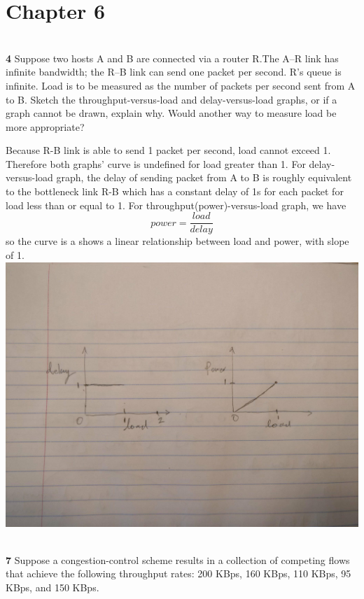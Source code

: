 \documentclass[11pt]{article}
\begin{document}
\section*{Chapter 6}

$ $\\
\textbf{4} Suppose two hosts A and B are connected via a router R.The A–R link has infinite bandwidth; the R–B link can send one packet per second. R’s queue is infinite. Load is to be measured as the number of packets per second sent from A to B. Sketch the throughput-versus-load and delay-versus-load graphs, or if a graph cannot be drawn, explain why. Would another way to measure load be more appropriate?

\begin{solution}
    Because R-B link is able to send 1 packet per second, load cannot exceed 1. Therefore both graphs' curve is undefined for load greater than 1. For delay-versus-load graph, the delay of sending packet from A to B is roughly equivalent to the bottleneck link R-B which has a constant delay of 1s for each packet for load less than or equal to 1. For throughput(power)-versus-load graph, we have 
    \[
        power = \frac{load}{delay}
    \]
    so the curve is a shows a linear relationship between load and power, with slope of 1.
    \includegraphics[width=\textwidth]{figure1.jpg}
\end{solution}



$ $\\
\textbf{7} Suppose a congestion-control scheme results in a collection of competing flows that achieve the following throughput rates: 200 KBps, 160 KBps, 110 KBps, 95 KBps, and 150 KBps.
\end{document}

